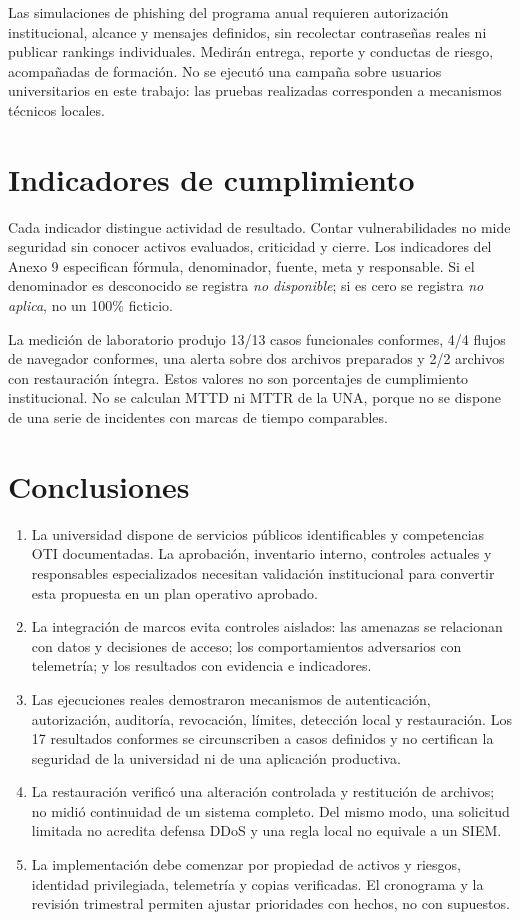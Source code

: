 \documentclass[10pt,a4paper]{article}
\begin{document}
Las simulaciones de phishing del programa anual requieren autorización institucional, alcance y mensajes definidos, sin recolectar contraseñas reales ni publicar rankings individuales. Medirán entrega, reporte y conductas de riesgo, acompañadas de formación. No se ejecutó una campaña sobre usuarios universitarios en este trabajo: las pruebas realizadas corresponden a mecanismos técnicos locales.

\section{Indicadores de cumplimiento}
Cada indicador distingue actividad de resultado. Contar vulnerabilidades no mide seguridad sin conocer activos evaluados, criticidad y cierre. Los indicadores del Anexo 9 especifican fórmula, denominador, fuente, meta y responsable. Si el denominador es desconocido se registra \emph{no disponible}; si es cero se registra \emph{no aplica}, no un 100\% ficticio.

La medición de laboratorio produjo 13/13 casos funcionales conformes, 4/4 flujos de navegador conformes, una alerta sobre dos archivos preparados y 2/2 archivos con restauración íntegra. Estos valores no son porcentajes de cumplimiento institucional. No se calculan MTTD ni MTTR de la UNA, porque no se dispone de una serie de incidentes con marcas de tiempo comparables.

\section*{Conclusiones}
\begin{enumerate}
\item La universidad dispone de servicios públicos identificables y competencias OTI documentadas. La aprobación, inventario interno, controles actuales y responsables especializados necesitan validación institucional para convertir esta propuesta en un plan operativo aprobado.
\item La integración de marcos evita controles aislados: las amenazas se relacionan con datos y decisiones de acceso; los comportamientos adversarios con telemetría; y los resultados con evidencia e indicadores.
\item Las ejecuciones reales demostraron mecanismos de autenticación, autorización, auditoría, revocación, límites, detección local y restauración. Los 17 resultados conformes se circunscriben a casos definidos y no certifican la seguridad de la universidad ni de una aplicación productiva.
\item La restauración verificó una alteración controlada y restitución de archivos; no midió continuidad de un sistema completo. Del mismo modo, una solicitud limitada no acredita defensa DDoS y una regla local no equivale a un SIEM.
\item La implementación debe comenzar por propiedad de activos y riesgos, identidad privilegiada, telemetría y copias verificadas. El cronograma y la revisión trimestral permiten ajustar prioridades con hechos, no con supuestos.
\end{enumerate}
\end{document}
